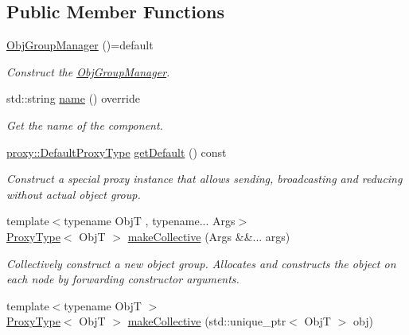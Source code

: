 \subsection*{Public Member Functions}
\begin{DoxyCompactItemize}
\item 
\hyperlink{structvt_1_1objgroup_1_1_obj_group_manager_a2de45aef25bff09a2fafabe227aa0ee7}{Obj\+Group\+Manager} ()=default
\begin{DoxyCompactList}\small\item\em Construct the \hyperlink{structvt_1_1objgroup_1_1_obj_group_manager}{Obj\+Group\+Manager}. \end{DoxyCompactList}\item 
std\+::string \hyperlink{structvt_1_1objgroup_1_1_obj_group_manager_a92c0b07c2d90063c40087f625880cca3}{name} () override
\begin{DoxyCompactList}\small\item\em Get the name of the component. \end{DoxyCompactList}\item 
\hyperlink{namespacevt_1_1objgroup_1_1proxy_ac7e0a0acb3b31d5469a603de08192adc}{proxy\+::\+Default\+Proxy\+Type} \hyperlink{structvt_1_1objgroup_1_1_obj_group_manager_a4447b8f4881710bc7b0b7a37de9d10b9}{get\+Default} () const
\begin{DoxyCompactList}\small\item\em Construct a special proxy instance that allows sending, broadcasting and reducing without actual object group. \end{DoxyCompactList}\item 
{\footnotesize template$<$typename ObjT , typename... Args$>$ }\\\hyperlink{structvt_1_1objgroup_1_1_obj_group_manager_aea65eef52f240a52210132eef5ce591f}{Proxy\+Type}$<$ ObjT $>$ \hyperlink{structvt_1_1objgroup_1_1_obj_group_manager_a651c44a47c6bcdc9f1b6c9e857fa03f2}{make\+Collective} (Args \&\&... args)
\begin{DoxyCompactList}\small\item\em Collectively construct a new object group. Allocates and constructs the object on each node by forwarding constructor arguments. \end{DoxyCompactList}\item 
{\footnotesize template$<$typename ObjT $>$ }\\\hyperlink{structvt_1_1objgroup_1_1_obj_group_manager_aea65eef52f240a52210132eef5ce591f}{Proxy\+Type}$<$ ObjT $>$ \hyperlink{structvt_1_1objgroup_1_1_obj_group_manager_ac1c2489611d2064b89b65b90059b2c4b}{make\+Collective} (std\+::unique\+\_\+ptr$<$ ObjT $>$ obj)

\end{DoxyCompactItemize}
